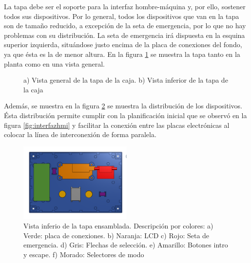 La tapa debe ser el soporte para la interfaz hombre-máquina y, por ello, sostener todos sus 
dispositivos. Por lo general, todos los dispositivos que van en la tapa son de tamaño reducido,
a excepción de la seta de emergencia, por lo que no hay problemas con su distribución. La seta
de emergencia irá dispuesta en la esquina superior izquierda, situándose justo encima de la placa
de conexiones del fondo, ya que ésta es la de menor altura. En la figura \ref{fig:cajatapa} se 
muestra la tapa tanto en la planta como en una vista general.

\begin{figure}[h]%
    \centering 
    \hspace{10pt}%
    \caption{a) Vista general de la tapa de la caja. b) Vista inferior de la tapa de la caja}
    \label{fig:cajatapa} 
\end{figure} 

Además, se muestra en la figura \ref{fig:cajatapaensamblaje} se muestra la distribución de los 
dispositivos. Ésta distribución permite cumplir con la planificación inicial que se observó en 
la figura \ref{fig:interfazhmi} y facilitar la conexión entre las placas electrónicas al colocar
la línea de interconexión de forma paralela.

\begin{figure}[h]%
    \centering 
        \includegraphics[width=0.5\textwidth]{04-caja/ensamblajetapainferior.png}
    \caption{Vista inferio de la tapa ensamblada. Descripción por colores: a) Verde: placa de 
    conexiones. b) Naranja: LCD c) Rojo: Seta de emergencia. d) Gris: Flechas de selección.
    e) Amarillo: Botones intro y escape. f) Morado: Selectores de modo}
    \label{fig:cajatapaensamblaje} 
\end{figure}